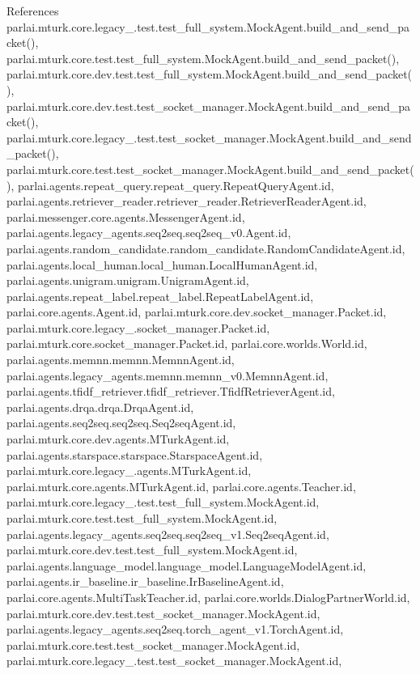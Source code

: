 References parlai.\+mturk.\+core.\+legacy\+\_.\+test.\+test\+\_\+full\+\_\+system.\+Mock\+Agent.\+build\+\_\+and\+\_\+send\+\_\+packet(), parlai.\+mturk.\+core.\+test.\+test\+\_\+full\+\_\+system.\+Mock\+Agent.\+build\+\_\+and\+\_\+send\+\_\+packet(), parlai.\+mturk.\+core.\+dev.\+test.\+test\+\_\+full\+\_\+system.\+Mock\+Agent.\+build\+\_\+and\+\_\+send\+\_\+packet(), parlai.\+mturk.\+core.\+dev.\+test.\+test\+\_\+socket\+\_\+manager.\+Mock\+Agent.\+build\+\_\+and\+\_\+send\+\_\+packet(), parlai.\+mturk.\+core.\+legacy\+\_.\+test.\+test\+\_\+socket\+\_\+manager.\+Mock\+Agent.\+build\+\_\+and\+\_\+send\+\_\+packet(), parlai.\+mturk.\+core.\+test.\+test\+\_\+socket\+\_\+manager.\+Mock\+Agent.\+build\+\_\+and\+\_\+send\+\_\+packet(), parlai.\+agents.\+repeat\+\_\+query.\+repeat\+\_\+query.\+Repeat\+Query\+Agent.\+id, parlai.\+agents.\+retriever\+\_\+reader.\+retriever\+\_\+reader.\+Retriever\+Reader\+Agent.\+id, parlai.\+messenger.\+core.\+agents.\+Messenger\+Agent.\+id, parlai.\+agents.\+legacy\+\_\+agents.\+seq2seq.\+seq2seq\+\_\+v0.\+Agent.\+id, parlai.\+agents.\+random\+\_\+candidate.\+random\+\_\+candidate.\+Random\+Candidate\+Agent.\+id, parlai.\+agents.\+local\+\_\+human.\+local\+\_\+human.\+Local\+Human\+Agent.\+id, parlai.\+agents.\+unigram.\+unigram.\+Unigram\+Agent.\+id, parlai.\+agents.\+repeat\+\_\+label.\+repeat\+\_\+label.\+Repeat\+Label\+Agent.\+id, parlai.\+core.\+agents.\+Agent.\+id, parlai.\+mturk.\+core.\+dev.\+socket\+\_\+manager.\+Packet.\+id, parlai.\+mturk.\+core.\+legacy\+\_.\+socket\+\_\+manager.\+Packet.\+id, parlai.\+mturk.\+core.\+socket\+\_\+manager.\+Packet.\+id, parlai.\+core.\+worlds.\+World.\+id, parlai.\+agents.\+memnn.\+memnn.\+Memnn\+Agent.\+id, parlai.\+agents.\+legacy\+\_\+agents.\+memnn.\+memnn\+\_\+v0.\+Memnn\+Agent.\+id, parlai.\+agents.\+tfidf\+\_\+retriever.\+tfidf\+\_\+retriever.\+Tfidf\+Retriever\+Agent.\+id, parlai.\+agents.\+drqa.\+drqa.\+Drqa\+Agent.\+id, parlai.\+agents.\+seq2seq.\+seq2seq.\+Seq2seq\+Agent.\+id, parlai.\+mturk.\+core.\+dev.\+agents.\+M\+Turk\+Agent.\+id, parlai.\+agents.\+starspace.\+starspace.\+Starspace\+Agent.\+id, parlai.\+mturk.\+core.\+legacy\+\_.\+agents.\+M\+Turk\+Agent.\+id, parlai.\+mturk.\+core.\+agents.\+M\+Turk\+Agent.\+id, parlai.\+core.\+agents.\+Teacher.\+id, parlai.\+mturk.\+core.\+legacy\+\_.\+test.\+test\+\_\+full\+\_\+system.\+Mock\+Agent.\+id, parlai.\+mturk.\+core.\+test.\+test\+\_\+full\+\_\+system.\+Mock\+Agent.\+id, parlai.\+agents.\+legacy\+\_\+agents.\+seq2seq.\+seq2seq\+\_\+v1.\+Seq2seq\+Agent.\+id, parlai.\+mturk.\+core.\+dev.\+test.\+test\+\_\+full\+\_\+system.\+Mock\+Agent.\+id, parlai.\+agents.\+language\+\_\+model.\+language\+\_\+model.\+Language\+Model\+Agent.\+id, parlai.\+agents.\+ir\+\_\+baseline.\+ir\+\_\+baseline.\+Ir\+Baseline\+Agent.\+id, parlai.\+core.\+agents.\+Multi\+Task\+Teacher.\+id, parlai.\+core.\+worlds.\+Dialog\+Partner\+World.\+id, parlai.\+mturk.\+core.\+dev.\+test.\+test\+\_\+socket\+\_\+manager.\+Mock\+Agent.\+id, parlai.\+agents.\+legacy\+\_\+agents.\+seq2seq.\+torch\+\_\+agent\+\_\+v1.\+Torch\+Agent.\+id, parlai.\+mturk.\+core.\+test.\+test\+\_\+socket\+\_\+manager.\+Mock\+Agent.\+id, parlai.\+mturk.\+core.\+legacy\+\_.\+test.\+test\+\_\+socket\+\_\+manager.\+Mock\+Agent.\+id, 